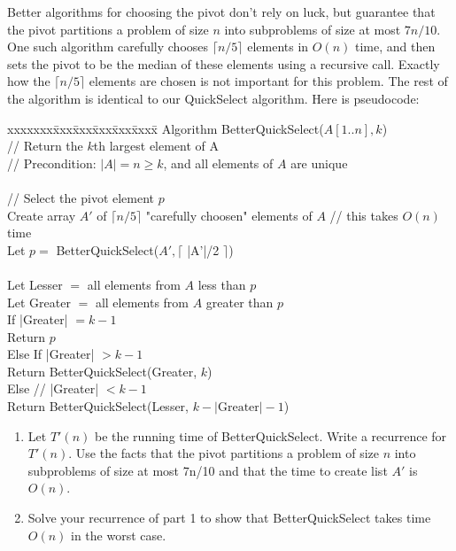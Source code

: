 \documentclass[11pt]{article}
\def\question#1{\red{#1}}
\def\red#1{{\color{red}#1}}
\begin{document}
Better algorithms for choosing the pivot don't rely on luck, but
guarantee that the pivot partitions a problem of size $n$ into subproblems of
size at most $7n/10$. One such algorithm carefully chooses $\lceil n/5 \rceil$
elements in $O(n)$ time, and then sets the pivot to be the median
of these elements using a recursive call.  Exactly how the $\lceil n/5 \rceil$
elements are chosen is not important for this problem.  The rest of
the algorithm is identical to our QuickSelect algorithm. Here is
pseudocode:

\begin{tabbing}
xxxxxxx\=xxx\=xxx\=xxx\=xxx\=xxxx\= \kill
\> Algorithm  BetterQuickSelect($A[1..n], k$) \\
\>\> // Return the $k$th largest element of A  \\
\>\> // Precondition: $|A| = n \ge k$, and all elements of $A$ are unique \\ \\

\>\> // Select the pivot element $p$ \\
\>\> Create array $A'$ of $\lceil n/5 \rceil$ "carefully choosen" elements of $A$ // this takes $O(n)$ time \\
\>\> Let $p =$ BetterQuickSelect($A', \lceil$ |A'|/2 $\rceil$) \\ \\
\>\> Let Lesser  $=$ all elements from $A$ less than $p$ \\ 
\>\> Let Greater $=$ all elements from $A$ greater than $p$ \\
\>\> If |Greater| $= k - 1$ \\
\>\>\>  Return $p$ \\
\>\> Else If |Greater| $> k - 1$ \\
\>\>\>  Return BetterQuickSelect(Greater, $k$) \\
\>\> Else  // |Greater| $< k - 1$ \\
\>\>\>  Return BetterQuickSelect(Lesser, $k - |\mbox{Greater}| - 1$)
\end{tabbing}

\begin{enumerate}
\item 
Let $T'(n)$ be the running time of BetterQuickSelect.
\question{Write a recurrence for $T'(n)$.} Use
the facts that the pivot partitions a problem of size $n$ into subproblems of size at most 7n/10
and that the time to create list $A'$ is $O(n)$.

\item \question{Solve your recurrence of part 1 to show that BetterQuickSelect takes time $O(n)$ in the worst case.}
\end{enumerate}
\end{document}
